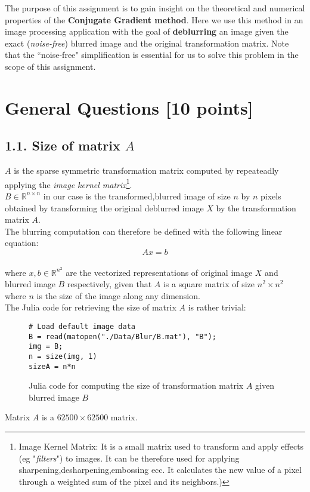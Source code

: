 \documentclass[unicode,11pt,a4paper,oneside,numbers=endperiod,openany]{scrartcl}
\begin{document}
\setassignment
{}

\newline

\assignmentpolicy


The purpose of this assignment is to gain insight on the theoretical and numerical properties of the \textbf{Conjugate Gradient method}. Here we use this method in an image processing application with the goal of \textbf{deblurring} an image given the exact (\textit{noise-free}) blurred image and the original transformation matrix. Note that the ``noise-free" simplification is essential for us to solve this problem in the scope of this assignment.
\tableofcontents
\clearpage


\section{General Questions [10 points]}
\subsection*{1.1. Size of matrix $A$}
$A$ is the sparse symmetric transformation matrix computed by repeateadly applying the \textit{image kernel matrix}\footnote{Image Kernel Matrix: It is a small matrix 
used to transform and apply effects (eg "\textit{filters}") to images. It can be therefore used for applying sharpening,desharpening,embossing ecc. It calculates the new value of a pixel through a weighted sum of the pixel and its neighbors.)}.\\
$B \in \mathds{R}^{n\times n}$ in our case is the transformed,blurred image of size $n$ by $n$ pixels obtained by transforming the original deblurred image $X$ by the transformation matrix $A$.\\
The blurring computation can therefore be defined with the following linear equation:
$$
Ax = b
\label{Eq:system}
$$\\
where $x,b\in \mathds{R}^{n^2}$ are the vectorized representations of original image $X$ and blurred image $B$ respectively, given that $A$ is a square matrix of size $n^2\times n^2$ where $n$ is the size of the image along any dimension.\\
The Julia code for retrieving the size of matrix $A$ is rather trivial:\\
\begin{figure}[H]
\begin{verbatim}
# Load default image data
B = read(matopen("./Data/Blur/B.mat"), "B");
img = B;
n = size(img, 1)
sizeA = n*n
\end{verbatim}

\caption{Julia code for computing the size of transformation matrix $A$ given blurred image $B$}
\end{figure}
Matrix $A$ is a $62500 \times 62500$ matrix.
\end{document}
